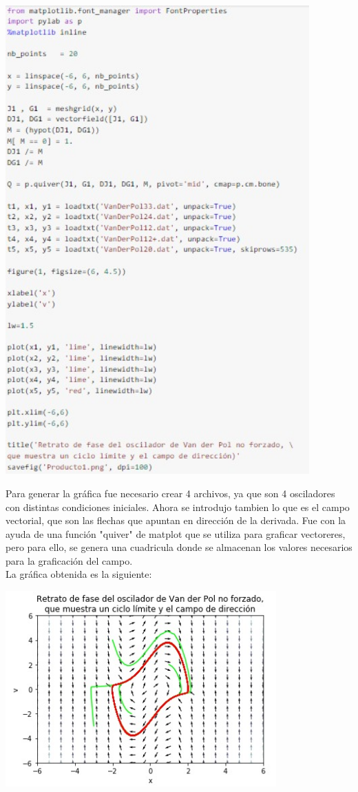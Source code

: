 \documentclass[12pt]{article}
\begin{document}
\begin{center}
    \includegraphics[height=18cm]{O2.jpeg}\\
\end{center}
Para generar la gráfica fue necesario crear 4 archivos, ya que son 4 osciladores con distintas condiciones iniciales. Ahora se introdujo tambien lo que es el campo vectorial, que son las flechas que apuntan en dirección de la derivada. Fue con la ayuda de una función "quiver" de matplot que se utiliza para graficar vectoreres, pero para ello, se genera una cuadricula donde se almacenan los valores necesarios para la graficación del campo.\\

La gráfica obtenida es la siguiente:
\begin{center}
    \includegraphics[height=7.5cm]{2.jpeg}\\
\end{center}
\end{document}

